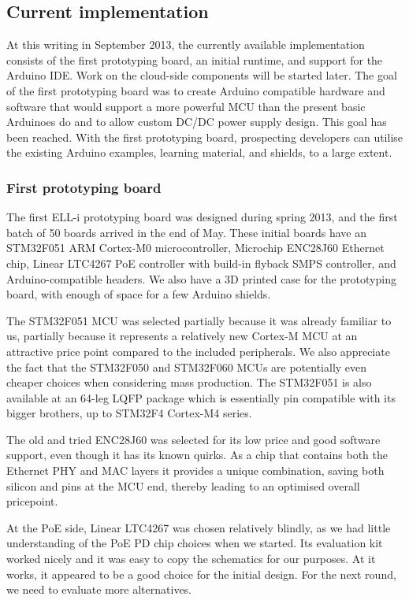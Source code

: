 \documentclass[draft,a4paper]{siamltex}
\begin{document}
\subsection{Current implementation}

At this writing in September 2013, the currently available
implementation consists of the first prototyping board, an initial
runtime, and support for the Arduino IDE.  Work on the cloud-side
components will be started later.
The goal of the first prototyping board was to create Arduino
compatible hardware and software that would support a more powerful
MCU than the present basic Arduinoes do and to allow custom DC/DC
power supply design.  This goal has been reached.  With the first
prototyping board, prospecting developers can utilise the existing
Arduino examples, learning material, and shields, to a large extent.

\subsubsection{First prototyping board}

The first ELL-i prototyping board was designed during spring 2013, and
the first batch of 50 boards arrived in the end of May.  These initial
boards have an STM32F051\cite{STM32F051} ARM Cortex-M0
microcontroller, Microchip ENC28J60\cite{ENC28J60} Ethernet chip,
Linear LTC4267 PoE controller with build-in flyback SMPS controller,
and Arduino-compatible headers.  We also have a 3D printed case for
the prototyping board, with enough of space for a few Arduino shields.

The STM32F051 MCU was selected partially because it was already
familiar to us, partially because it represents a relatively new
Cortex-M MCU at an attractive price point compared to the included
peripherals.  We also appreciate the fact that the STM32F050 and
STM32F060 MCUs are potentially even cheaper choices when considering
mass production.  The STM32F051 is also available at an 64-leg LQFP
package which is essentially pin compatible with its bigger brothers,
up to STM32F4 Cortex-M4 series.

The old and tried ENC28J60 was selected for its low price and good
software support, even though it has its known quirks.  As a chip that
contains both the Ethernet PHY and MAC layers it provides a unique
combination, saving both silicon and pins at the MCU end, thereby
leading to an optimised overall pricepoint.

At the PoE side, Linear LTC4267 was chosen relatively blindly, as we
had little understanding of the PoE PD chip choices when we started.
Its evaluation kit worked nicely and it was easy to copy the
schematics for our purposes.  At it works, it appeared to be a good
choice for the initial design.  For the next round, we need to
evaluate more alternatives.
\end{document}
